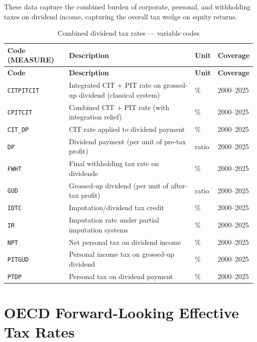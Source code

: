 \documentclass[11pt,a4paper]{article}
\newcommand{\code}[1]{\texttt{#1}}
\begin{document}
These data capture the combined burden of corporate, personal, and withholding taxes on dividend income, capturing the overall tax wedge on equity returns.

\begin{longtable}{@{}L{2.8cm} L{6.5cm} C{1.8cm} C{2.5cm}@{}}
\caption{Combined dividend tax rates --- variable codes}\label{tab:div_rates}\\
\toprule
\textbf{Code (MEASURE)} & \textbf{Description} & \textbf{Unit} & \textbf{Coverage} \\
\midrule
\endfirsthead
\toprule
\textbf{Code} & \textbf{Description} & \textbf{Unit} & \textbf{Coverage} \\
\midrule
\endhead
\bottomrule
\endlastfoot
\code{CITPITCIT}  & Integrated CIT + PIT rate on grossed-up dividend (classical system) & \% & 2000--2025 \\
\code{CPITCIT}    & Combined CIT + PIT rate (with integration relief) & \% & 2000--2025 \\
\code{CIT\_DP}    & CIT rate applied to dividend payment & \% & 2000--2025 \\
\code{DP}         & Dividend payment (per unit of pre-tax profit) & ratio & 2000--2025 \\
\code{FWHT}       & Final withholding tax rate on dividends & \% & 2000--2025 \\
\code{GUD}        & Grossed-up dividend (per unit of after-tax profit) & ratio & 2000--2025 \\
\code{IDTC}       & Imputation/dividend tax credit & \% & 2000--2025 \\
\code{IR}         & Imputation rate under partial imputation systems & \% & 2000--2025 \\
\code{NPT}        & Net personal tax on dividend income & \% & 2000--2025 \\
\code{PITGUD}     & Personal income tax on grossed-up dividend & \% & 2000--2025 \\
\code{PTDP}       & Personal tax on dividend payment & \% & 2000--2025 \\
\end{longtable}


\section{OECD Forward-Looking Effective Tax Rates}\label{sec:etr}
\end{document}
